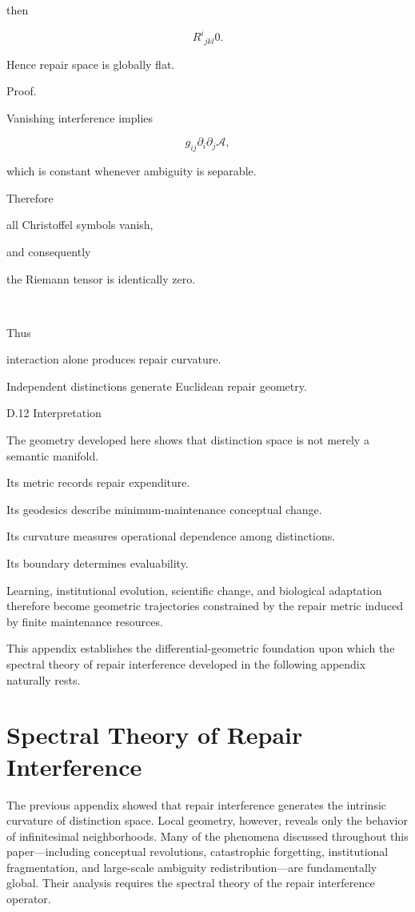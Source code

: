 \documentclass[12pt,oneside]{article}
\theoremstyle{plain}
\theoremstyle{definition}
\theoremstyle{remark}
\begin{document}
then

\[
R^i{}_{jkl}
0. 

\]

Hence repair space is globally flat.

Proof.

Vanishing interference implies

\[
g_{ij}
\partial_i\partial_j
\mathcal A,
\]

which is constant whenever ambiguity is separable.

Therefore

all Christoffel symbols vanish,

and consequently

the Riemann tensor is identically zero.

\square

Thus

interaction alone produces repair curvature.

Independent distinctions generate Euclidean repair geometry.


D.12 Interpretation

The geometry developed here shows that distinction space is not merely a semantic manifold.

Its metric records repair expenditure.

Its geodesics describe minimum-maintenance conceptual change.

Its curvature measures operational dependence among distinctions.

Its boundary determines evaluability.

Learning, institutional evolution, scientific change, and biological adaptation therefore become geometric trajectories constrained by the repair metric induced by finite maintenance resources.

This appendix establishes the differential-geometric foundation upon which the spectral theory of repair interference developed in the following appendix naturally rests.

\section{Spectral Theory of Repair Interference}

The previous appendix showed that repair interference generates the intrinsic curvature of distinction space. Local geometry, however, reveals only the behavior of infinitesimal neighborhoods. Many of the phenomena discussed throughout this paper—including conceptual revolutions, catastrophic forgetting, institutional fragmentation, and large-scale ambiguity redistribution—are fundamentally global. Their analysis requires the spectral theory of the repair interference operator.
\end{document}
